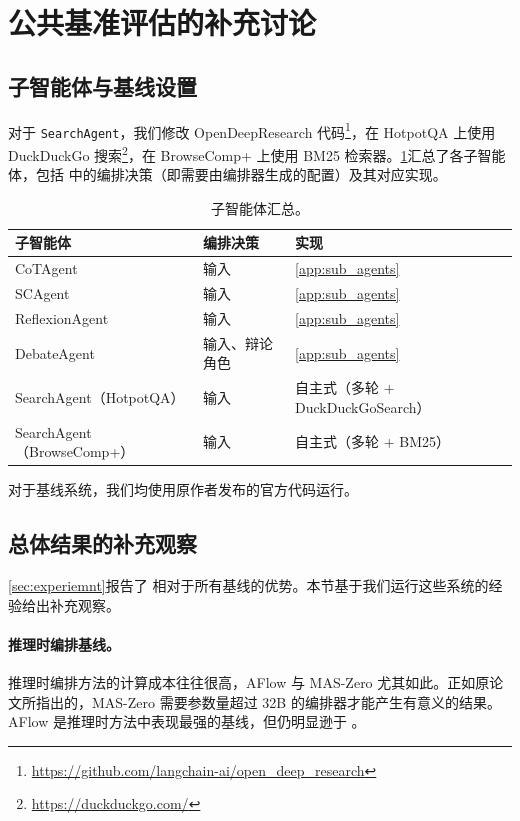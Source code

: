 \section{公共基准评估的补充讨论}
\label{ap:disucuss_public}


\subsection{子智能体与基线设置}
\label{ap:discuss_baselines}

对于 \texttt{SearchAgent}，我们修改 OpenDeepResearch 代码\footnote{\url{https://github.com/langchain-ai/open_deep_research}}，在 HotpotQA 上使用 DuckDuckGo 搜索\footnote{\url{https://duckduckgo.com/}}，在 BrowseComp+ 上使用 BM25 检索器\citep{robertson1994okapi}。\cref{tab:baseline_setup}汇总了各子智能体，包括 \ourframework 中的编排决策（即需要由编排器生成的配置）及其对应实现。

\begin{table}[h]
\centering
\small
\begin{tabular}{l l l}
\toprule
\textbf{子智能体} & \textbf{编排决策} & \textbf{实现} \\
\midrule
CoTAgent & 输入 & \cref{app:sub_agents} \\
SCAgent & 输入 & \cref{app:sub_agents} \\
ReflexionAgent & 输入 & \cref{app:sub_agents} \\
DebateAgent & 输入、辩论角色 & \cref{app:sub_agents} \\
SearchAgent（HotpotQA）& 输入 & 自主式（多轮 + DuckDuckGoSearch）\\
SearchAgent（BrowseComp+）& 输入 & 自主式（多轮 + BM25）\\
\bottomrule
\end{tabular}
\caption{子智能体汇总。
}
\label{tab:baseline_setup}
\end{table}

对于基线系统，我们均使用原作者发布的官方代码运行。

\subsection{总体结果的补充观察}
\label{ap:addition_observation}


\cref{sec:experiemnt}报告了 \ourframework 相对于所有基线的优势。本节基于我们运行这些系统的经验给出补充观察。

\paragraph{推理时编排基线。}
推理时编排方法的计算成本往往很高，AFlow 与 MAS-Zero 尤其如此。正如原论文\citep{Ke2025MASZero}所指出的，MAS-Zero 需要参数量超过 32B 的编排器才能产生有意义的结果。AFlow 是推理时方法中表现最强的基线，但仍明显逊于 \ourframework。

